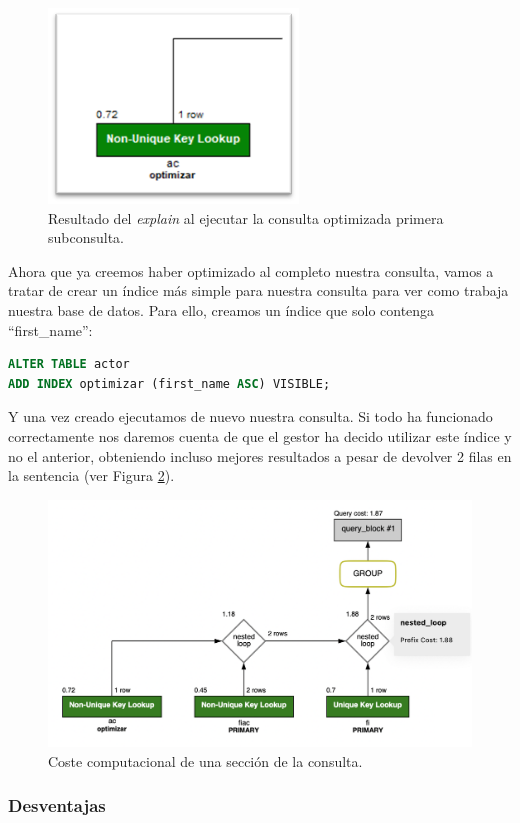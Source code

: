 \documentclass{db-practice}
\begin{document}
\begin{figure}[ht]
    \centering
    \includegraphics[width=0.3\columnwidth]{figs/ejecucion1part1.png}
    \caption{Resultado del \emph{explain} al ejecutar la consulta optimizada primera subconsulta.}\label{fig:ejecucion1part1}
\end{figure}

Ahora que ya creemos haber optimizado al completo nuestra consulta, vamos a tratar de crear un índice más simple para nuestra consulta para ver como trabaja nuestra base de datos. Para ello, creamos un índice que solo contenga ``first\_name'':

\begin{lstlisting}[language=SQL]
ALTER TABLE actor
ADD INDEX optimizar (first_name ASC) VISIBLE;
\end{lstlisting}

Y una vez creado ejecutamos de nuevo nuestra consulta. Si todo ha funcionado correctamente nos daremos cuenta de que el gestor ha decido utilizar este índice y no el anterior, obteniendo incluso mejores resultados a pesar de devolver 2 filas en la sentencia (ver Figura \ref{fig:ejecucion1coste}).

\begin{figure}[ht]
    \centering
    \includegraphics[width=0.6\columnwidth]{figs/ejecucion1coste.png}
    \caption{Coste computacional de una sección de la consulta.}\label{fig:ejecucion1coste}
\end{figure}

\subsubsection*{Desventajas}
\end{document}

